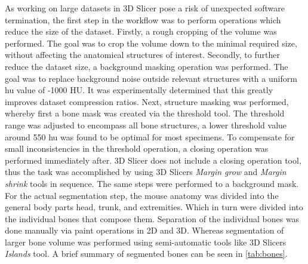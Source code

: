 \noindent
As working on large datasets in 3D Slicer pose a risk of unexpected software termination, the first step in the workflow was to perform operations which reduce the size of the dataset.
Firstly, a rough cropping of the volume was performed.
The goal was to crop the volume down to the minimal required size, without affecting the anatomical structures of interest.
Secondly, to further reduce the dataset size, a background masking operation was performed.
The goal was to replace background noise outside relevant structures with a uniform \acrshort{hu} value of -1000 HU.
It was experimentally determined that this greatly improves dataset compression ratios.
Next, structure masking was performed, whereby first a bone mask was created via the threshold tool.
The threshold range was adjusted to encompass all bone structures, a lower threshold value around 550 \acrshort{hu} was found to be optimal for most specimens.
To compensate for small inconsistencies in the threshold operation, a closing operation was performed immediately after.
3D Slicer does not include a closing operation tool, thus the task was
accomplished by using 3D Slicers \textit{Margin grow} and \textit{Margin shrink} tools in sequence.
The same steps were performed to a background mask.
For the actual segmentation step, the mouse anatomy was divided into the general body parts head, trunk, and extremities.
Which in turn were divided into the individual bones that compose them.
Separation of the individual bones was done manually via paint operations in 2D and 3D.
Whereas segmentation of larger bone volume was performed using semi-automatic tools like 3D Slicers \textit{Islands} tool.
A brief summary of segmented bones can be seen in \cref{tab:bones}.
